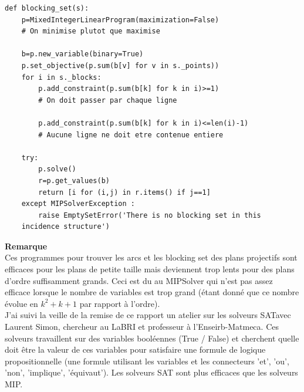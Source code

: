 \documentclass[a4paper]{article}
\begin{document}
\begin{lstlisting}
def blocking_set(s):
    p=MixedIntegerLinearProgram(maximization=False)
    # On minimise plutot que maximise 

    b=p.new_variable(binary=True)
    p.set_objective(p.sum(b[v] for v in s._points))
    for i in s._blocks:
        p.add_constraint(p.sum(b[k] for k in i)>=1)
        # On doit passer par chaque ligne

        p.add_constraint(p.sum(b[k] for k in i)<=len(i)-1)
        # Aucune ligne ne doit etre contenue entiere 
        
    try:
        p.solve()
        r=p.get_values(b)
        return [i for (i,j) in r.items() if j==1]
    except MIPSolverException :
        raise EmptySetError('There is no blocking set in this
    incidence structure')  
\end{lstlisting}
\vspace{1\baselineskip}

\textbf{Remarque}\\
Ces programmes pour trouver les arcs et les blocking set des plans projectifs sont efficaces pour les plans de petite taille mais deviennent trop lents pour des plans d'ordre suffisamment grands. Ceci est du au MIPSolver qui n'est pas assez efficace lorsque le nombre de variables est trop grand (étant donné que ce nombre évolue en $k^2 + k + 1$ par rapport à l'ordre).\\
J'ai suivi la veille de la remise de ce rapport un atelier sur les solveurs SATavec Laurent Simon, chercheur au LaBRI et professeur à l'Enseirb-Matmeca. Ces solveurs travaillent sur des variables booléennes (True / False) et cherchent quelle doit être la valeur de ces variables pour satisfaire une formule de logique propositionnelle (une formule utilisant les variables et les connecteurs 'et', 'ou', 'non', 'implique', 'équivaut'). Les solveurs SAT sont plus efficaces que les solveurs MIP.
\newpage
\end{document}
